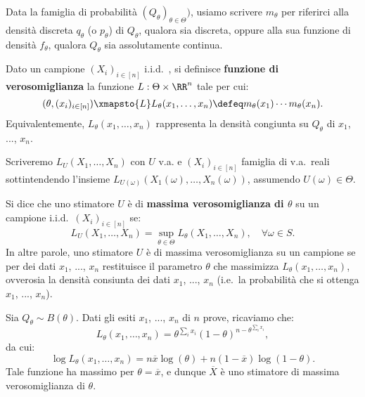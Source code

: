 \begin{multicols*}{2}
\begin{notation}
    Data la famiglia di probabilità $(Q_\theta)_{\theta \in \Theta})$, usiamo
    scrivere $m_\theta$ per riferirci alla densità discreta $q_\theta$ (o $p_\theta$)
    di $Q_\theta$, qualora sia discreta, oppure alla sua funzione di densità
    $f_\theta$, qualora $Q_\theta$ sia assolutamente continua.
\end{notation}

\begin{definition}
    Dato un campione $(X_i)_{i \in [n]}$ i.i.d.~, si definisce
    \textbf{funzione di verosomiglianza} la funzione $L : \Theta \times \RR^n$
    tale per cui:
    \[
        (\theta, (x_i)_{i \in [n]}) \xmapsto{L} L_\theta(x_1, \ldots, x_n) \defeq m_\theta(x_1) \cdots m_\theta(x_n).
    \]
    Equivalentemente, $L_\theta(x_1, \ldots, x_n)$ rappresenta la densità congiunta su $Q_\theta$
    di $x_1$, ..., $x_n$.
\end{definition}

\begin{notation}
    Scriveremo $L_U(X_1, \ldots, X_n)$ con $U$ v.a. e
    $(X_i)_{i \in [n]}$ famiglia di v.a.~reali sottintendendo
    l'insieme $L_{U(\omega)}(X_1(\omega), \ldots, X_n(\omega))$,
    assumendo $U(\omega) \in \Theta$.
\end{notation}

\begin{definition}
    Si dice che uno stimatore $U$ è di \textbf{massima verosomiglianza di $\theta$}
    su un campione i.i.d.~$(X_i)_{i \in [n]}$ se:
    \[
        L_U(X_1, \ldots, X_n) = \sup_{\theta \in \Theta} L_\theta(X_1, \ldots, X_n), \quad \forall \omega \in S.
    \]
    In altre parole, uno stimatore $U$ è di massima verosomiglianza su un campione se
    per dei dati $x_1$, ..., $x_n$ restituisce il parametro $\theta$ che massimizza
    $L_\theta(x_1, \ldots, x_n)$, ovverosia la densità consiunta dei dati
    $x_1$, ..., $x_n$ (i.e.~la probabilità che si ottenga $x_1$, ..., $x_n$).
\end{definition}

\begin{example}
    Sia $Q_\theta \sim B(\theta)$. Dati gli esiti $x_1$, ..., $x_n$ di $n$ prove,
    ricaviamo che:
    \[
        L_\theta(x_1, \ldots, x_n) = \theta^{\sum_i x_i} (1 - \theta)^{n - \theta^{\sum_i x_i}},
    \]
    da cui:
    \[
        \log L_\theta(x_1, \ldots, x_n) = n \overline{x} \log(\theta) + n (1 - \overline{x}) \log(1 - \theta).
    \]
    Tale funzione ha massimo per $\theta = \overline{x}$, e dunque
    $\overline{X}$ è uno stimatore di massima verosomiglianza di $\theta$. \smallskip


\end{example}
\end{multicols*}
